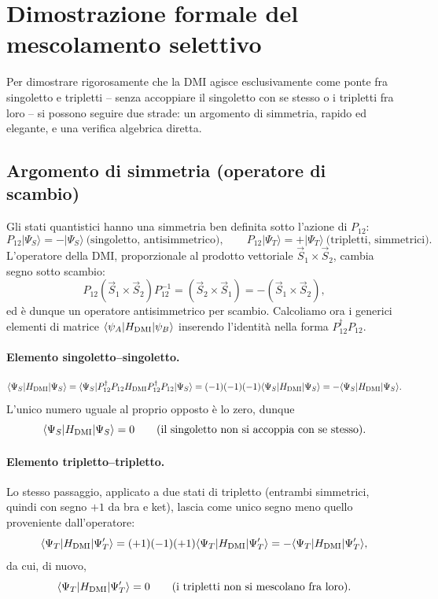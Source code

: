 \documentclass[11pt,a4paper]{article}
\begin{document}
\section{Dimostrazione formale del mescolamento selettivo}

Per dimostrare rigorosamente che la DMI agisce esclusivamente come ponte fra
singoletto e tripletti -- senza accoppiare il singoletto con se stesso o i tripletti
fra loro -- si possono seguire due strade: un argomento di simmetria, rapido ed
elegante, e una verifica algebrica diretta.

\subsection{Argomento di simmetria (operatore di scambio)}

Gli stati quantistici hanno una simmetria ben definita sotto l'azione di $P_{12}$:
$$P_{12}|\Psi_S\rangle = -|\Psi_S\rangle \ \text{(singoletto, antisimmetrico)}, \qquad P_{12}|\Psi_T\rangle = +|\Psi_T\rangle \ \text{(tripletti, simmetrici)}.$$
L'operatore della DMI, proporzionale al prodotto vettoriale $\vec S_1\times\vec S_2$,
cambia segno sotto scambio:
$$P_{12}(\vec S_1\times\vec S_2)P_{12}^{-1} = (\vec S_2\times\vec S_1) = -(\vec S_1\times\vec S_2),$$
ed \`e dunque un operatore antisimmetrico per scambio. Calcoliamo ora i generici
elementi di matrice $\langle\psi_A|H_{\rm DMI}|\psi_B\rangle$ inserendo l'identit\`a
nella forma $P_{12}^\dagger P_{12}$.

\paragraph{Elemento singoletto--singoletto.}
$$\langle\Psi_S|H_{\rm DMI}|\Psi_S\rangle = \langle\Psi_S|P_{12}^\dagger P_{12}H_{\rm DMI}P_{12}^\dagger P_{12}|\Psi_S\rangle = (-1)(-1)(-1)\langle\Psi_S|H_{\rm DMI}|\Psi_S\rangle = -\langle\Psi_S|H_{\rm DMI}|\Psi_S\rangle.$$
L'unico numero uguale al proprio opposto \`e lo zero, dunque
$$\langle\Psi_S|H_{\rm DMI}|\Psi_S\rangle = 0 \qquad \text{(il singoletto non si accoppia con se stesso)}.$$

\paragraph{Elemento tripletto--tripletto.} Lo stesso passaggio, applicato a due stati
di tripletto (entrambi simmetrici, quindi con segno $+1$ da bra e ket), lascia come
unico segno meno quello proveniente dall'operatore:
$$\langle\Psi_T|H_{\rm DMI}|\Psi_T'\rangle = (+1)(-1)(+1)\langle\Psi_T|H_{\rm DMI}|\Psi_T'\rangle = -\langle\Psi_T|H_{\rm DMI}|\Psi_T'\rangle,$$
da cui, di nuovo,
$$\langle\Psi_T|H_{\rm DMI}|\Psi_T'\rangle = 0 \qquad \text{(i tripletti non si mescolano fra loro)}.$$
\end{document}
